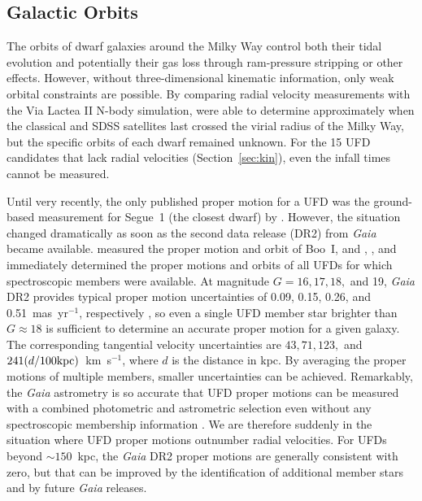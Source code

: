 \documentclass[a4paper]{ar-1col}
\newcommand{\kms}         {km~s$^{-1}$}
\begin{document}
\subsection{Galactic Orbits}

The orbits of dwarf galaxies around the Milky Way control both their
tidal evolution and potentially their gas loss through ram-pressure
stripping or other effects.  However, without three-dimensional
kinematic information, only weak orbital constraints are possible.  By
comparing radial velocity measurements with the Via Lactea II N-body
simulation, \citet{rocha12} were able to determine approximately when
the classical and SDSS satellites last crossed the virial radius of
the Milky Way, but the specific orbits of each dwarf remained unknown.
For the 15 UFD candidates that lack radial velocities
(Section~\ref{sec:kin}), even the infall times cannot be measured.

Until very recently, the only published proper motion for a UFD was
the ground-based measurement for Segue~1 (the closest dwarf) by
\citet{fritz18}.  However, the situation changed dramatically as soon
as the second data release (DR2) from \emph{Gaia} became available.
\citet{gaiadr2helmi} measured the proper motion and orbit of Boo~I,
and \citet{simon18}, \citet{fritz18b}, and \citet{kallivayalil18}
immediately determined the proper motions and orbits of all UFDs for
which spectroscopic members were available.  At magnitude $G = 16, 17,
18,$ and 19, \emph{Gaia} DR2 provides typical proper motion
uncertainties of 0.09, 0.15, 0.26, and 0.51~mas~yr$^{-1}$,
respectively \citep{lindegren18}, so even a single UFD member star
brighter than $G \approx 18$ is sufficient to determine an accurate
proper motion for a given galaxy.  The corresponding tangential
velocity uncertainties are $43, 71, 123,$ and $241 (d/100{\rm
  kpc})$~\kms, where $d$ is the distance in kpc.  By averaging the
proper motions of multiple members, smaller uncertainties can be
achieved.  Remarkably, the \emph{Gaia} astrometry is so accurate that
UFD proper motions can be measured with a combined photometric and
astrometric selection even without any spectroscopic membership
information \citep{mh18,pl18}.  We are therefore suddenly in the
situation where UFD proper motions outnumber radial velocities.  For
UFDs beyond $\sim150$~kpc, the \emph{Gaia} DR2 proper motions are
generally consistent with zero, but that can be improved by the
identification of additional member stars and by future \emph{Gaia}
releases.
\end{document}
